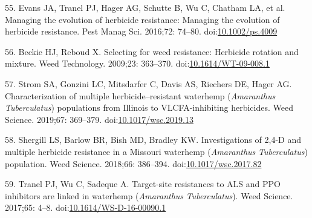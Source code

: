 \documentclass[10pt,letterpaper]{article}
\begin{document}
\leavevmode\hypertarget{ref-evans_managing_2016}{}%
55. Evans JA, Tranel PJ, Hager AG, Schutte B, Wu C, Chatham LA, et al.
Managing the evolution of herbicide resistance: Managing the evolution
of herbicide resistance. Pest Manag Sci. 2016;72: 74--80.
doi:\href{https://doi.org/10.1002/ps.4009}{10.1002/ps.4009}

\leavevmode\hypertarget{ref-beckie_selecting_2009}{}%
56. Beckie HJ, Reboud X. Selecting for weed resistance: Herbicide
rotation and mixture. Weed Technology. 2009;23: 363--370.
doi:\href{https://doi.org/10.1614/WT-09-008.1}{10.1614/WT-09-008.1}

\leavevmode\hypertarget{ref-strom_characterization_2019}{}%
57. Strom SA, Gonzini LC, Mitsdarfer C, Davis AS, Riechers DE, Hager AG.
Characterization of multiple herbicide--resistant waterhemp
(\emph{Amaranthus} \emph{Tuberculatus}) populations from Illinois to
VLCFA-inhibiting herbicides. Weed Science. 2019;67: 369--379.
doi:\href{https://doi.org/10.1017/wsc.2019.13}{10.1017/wsc.2019.13}

\leavevmode\hypertarget{ref-shergill_investigations_2018}{}%
58. Shergill LS, Barlow BR, Bish MD, Bradley KW. Investigations of 2,4-D
and multiple herbicide resistance in a Missouri waterhemp
(\emph{Amaranthus} \emph{Tuberculatus}) population. Weed Science.
2018;66: 386--394.
doi:\href{https://doi.org/10.1017/wsc.2017.82}{10.1017/wsc.2017.82}

\leavevmode\hypertarget{ref-tranel_target-site_2017}{}%
59. Tranel PJ, Wu C, Sadeque A. Target-site resistances to ALS and PPO
inhibitors are linked in waterhemp (\emph{Amaranthus}
\emph{Tuberculatus}). Weed Science. 2017;65: 4--8.
doi:\href{https://doi.org/10.1614/WS-D-16-00090.1}{10.1614/WS-D-16-00090.1}

\nolinenumbers
\end{document}
